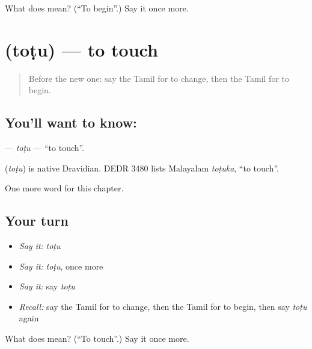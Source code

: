 \begin{tcolorbox}[breakable,colback=teal!4,colframe=teal!35!black,title={Before you move on}]
What does  mean? (\textquotedblleft{}To begin\textquotedblright{}.) Say it once more.
\end{tcolorbox}
\section[\texorpdfstring{\ta{தொடு} (toṭu)}{தொடு (toṭu)}]{ (toṭu) — to touch}

\label{lesson:TA-C226-totu}



\begin{quote}
Before the new one: say the Tamil for to change, then the Tamil for to begin.
\end{quote}

\subsection*{You'll want to know: }
\textbf{} — \emph{toṭu} — \textquotedblleft{}to touch\textquotedblright{}.

\begin{cousinweb}
\textbf{} (\emph{toṭu}) is native Dravidian. DEDR 3480 lists Malayalam \emph{toṭuka}, \textquotedblleft{}to touch\textquotedblright{}.
\end{cousinweb}

\begin{grammarlens}[title={What you've built}]
One more word for this chapter.
\end{grammarlens}

\subsection*{Your turn}
\begin{itemize}
\raggedright
  \item \emph{Say it:} \emph{toṭu}
  \item \emph{Say it:} \emph{toṭu}, once more
  \item \emph{Say it:} say \emph{toṭu}
  \item \emph{Recall:} say the Tamil for to change, then the Tamil for to begin, then say \emph{toṭu} again
\end{itemize}

\begin{tcolorbox}[breakable,colback=teal!4,colframe=teal!35!black,title={Before you move on}]
What does  mean? (\textquotedblleft{}To touch\textquotedblright{}.) Say it once more.
\end{tcolorbox}
